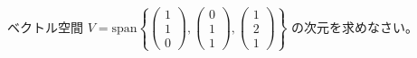 \begin{quiz}
ベクトル空間 $V = \text{span}\left\{ \begin{pmatrix} 1 \\ 1 \\ 0 \end{pmatrix}, \begin{pmatrix} 0 \\ 1 \\ 1 \end{pmatrix}, \begin{pmatrix} 1 \\ 2 \\ 1 \end{pmatrix} \right\}$ の次元を求めなさい。
\end{quiz}